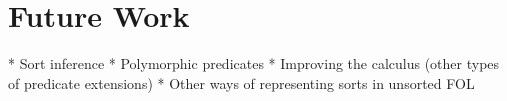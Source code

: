 \section{Future Work}

* Sort inference
* Polymorphic predicates
* Improving the calculus (other types of predicate extensions)
* Other ways of representing sorts in unsorted FOL

